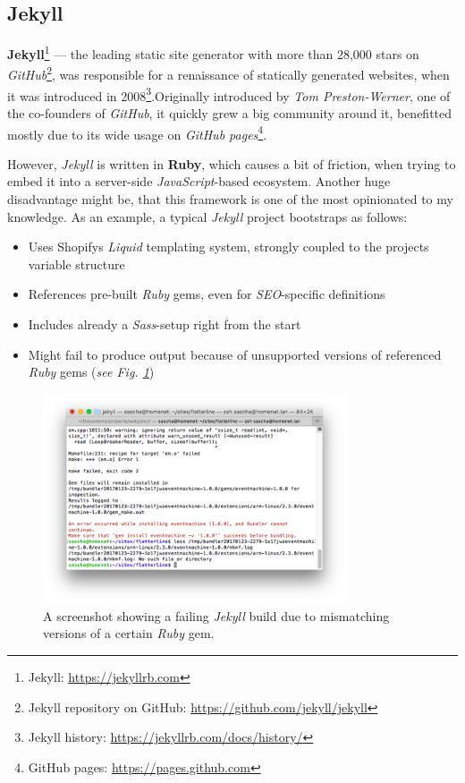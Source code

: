 \documentclass[a4paper,english,11pt]{report}
\begin{document}
\subsection{Jekyll}
\textbf{Jekyll}\footnote{Jekyll: \url{https://jekyllrb.com}} --- the leading static site generator with more than 28,000 stars on \emph{GitHub}\footnote{Jekyll repository on GitHub: \url{https://github.com/jekyll/jekyll}}, was responsible for a renaissance of statically generated websites, when it was introduced in 2008\footnote{Jekyll history: \url{https://jekyllrb.com/docs/history/}}.\newline Originally introduced by \emph{Tom Preston-Werner}, one of the co-founders of \emph{GitHub}, it quickly grew a big community around it, benefitted mostly due to its wide usage on \emph{GitHub pages}\footnote{GitHub pages: \url{https://pages.github.com}}.

However, \emph{Jekyll} is written in \textbf{Ruby}, which causes a bit of friction, when trying to embed it into a server-side \emph{JavaScript}-based ecosystem. Another huge disadvantage might be, that this framework is one of the most opinionated to my knowledge. As an example, a typical \emph{Jekyll} project bootstraps as follows:

\begin{itemize}
\item Uses Shopify\textquotesingle s \emph{Liquid} templating system, strongly coupled to the project\textquotesingle s variable structure
\item References pre-built \emph{Ruby} gems, even for \emph{SEO}-specific definitions
\item Includes already a \emph{Sass}-setup right from the start
\item Might fail to produce output because of unsupported versions of referenced \emph{Ruby} gems (\emph{see Fig. \ref{fig:jekyll_fail}})
\end{itemize}

%
\begin{figure}[p]
    \centering
    \includegraphics[width=0.8\textwidth]{jekyll_fail.png}
    \caption{A screenshot showing a failing \emph{Jekyll} build due to mismatching versions of a certain \emph{Ruby} gem.}
    \label{fig:jekyll_fail}
\end{figure}
%
\end{document}
